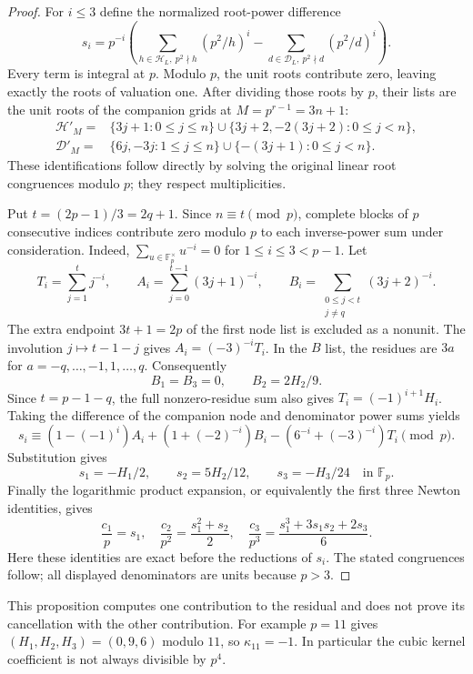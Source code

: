 \documentclass[11pt,letterpaper]{article}
\numberwithin{equation}{section}
\begin{document}
\begin{proof}
For $i\le3$ define the normalized root-power difference
\[
 s_i=p^{-i}\left(
 \sum_{h\in\mathcal H_L,\ p^2\nmid h}(p^2/h)^i
 -\sum_{d\in\mathcal D_L,\ p^2\nmid d}(p^2/d)^i\right).
\]
Every term is integral at $p$. Modulo $p$, the unit roots
contribute zero, leaving exactly the roots of valuation one.
After dividing those roots by $p$, their lists are the unit roots
of the companion grids at $M=p^{r-1}=3n+1$:
\[
 \begin{split}
 \mathcal H'_M={}&\{3j+1:0\le j\le n\}
 \cup\{3j+2,-2(3j+2):0\le j<n\},\\
 \mathcal D'_M={}&\{6j,-3j:1\le j\le n\}
 \cup\{-(3j+1):0\le j<n\}.
 \end{split}
\]
These identifications follow directly by solving the original
linear root congruences modulo $p$; they respect multiplicities.

Put $t=(2p-1)/3=2q+1$. Since $n\equiv t\pmod p$, complete
blocks of $p$ consecutive indices contribute zero modulo $p$ to
each inverse-power sum under consideration. Indeed,
$\sum_{u\in\mathbb F_p^\times}u^{-i}=0$ for $1\le i\le3<p-1$.
Let
\[
 T_i=\sum_{j=1}^{t}j^{-i},\qquad
 A_i=\sum_{j=0}^{t-1}(3j+1)^{-i},\qquad
 B_i=\sum_{\substack{0\le j<t\\j\ne q}}(3j+2)^{-i}.
\]
The extra endpoint $3t+1=2p$ of the first node list is excluded
as a nonunit. The involution $j\mapsto t-1-j$ gives
$A_i=(-3)^{-i}T_i$. In the $B$ list, the residues are
$3a$ for $a=-q,\ldots,-1,1,\ldots,q$. Consequently
\[
 B_1=B_3=0,\qquad B_2=2H_2/9.
\]
Since $t=p-1-q$, the full nonzero-residue sum also gives
$T_i=(-1)^{i+1}H_i$.
Taking the difference of the companion node and denominator
power sums yields
\[
 s_i\equiv
 (1-(-1)^i)A_i+(1+(-2)^{-i})B_i
 -(6^{-i}+(-3)^{-i})T_i\pmod p.
\]
Substitution gives
\[
 s_1=-H_1/2,\qquad s_2=5H_2/12,\qquad s_3=-H_3/24
 \quad\text{in }\mathbb F_p.
\]
Finally the logarithmic product expansion, or equivalently the
first three Newton identities, gives
\[
 \frac{c_1}{p}=s_1,\quad
 \frac{c_2}{p^2}=\frac{s_1^2+s_2}{2},\quad
 \frac{c_3}{p^3}=\frac{s_1^3+3s_1s_2+2s_3}{6}.
\]
Here these identities are exact before the reductions of $s_i$.
The stated congruences follow; all displayed denominators are
units because $p>3$.
\end{proof}

This proposition computes one contribution to the residual and
does not prove its cancellation with the other contribution.
For example $p=11$ gives $(H_1,H_2,H_3)=(0,9,6)$ modulo $11$,
so $\kappa_{11}=-1$. In particular the cubic kernel coefficient
is not always divisible by $p^4$.
\end{document}
